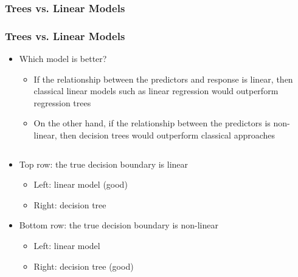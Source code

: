 \documentclass[
  shownotes,
  xcolor={svgnames},
  hyperref={colorlinks,citecolor=DarkBlue,linkcolor=DarkRed,urlcolor=DarkBlue}
  , aspectratio=169]{beamer}
\begin{document}
\subsubsection{Trees vs. Linear Models}
\begin{frame}[fragile]
\frametitle{Trees vs. Linear Models}
\begin{itemize}
\item Which model is better?

\begin{itemize}
  \item If the relationship between the predictors and response is linear, then classical linear models such as linear regression would outperform regression trees
  \item On the other hand, if the relationship between the predictors is non-linear, then decision trees would outperform classical approaches
\end{itemize}
\end{itemize}


\begin{columns}[T] %
\begin{column}{.42\textwidth}
\scriptsize
\begin{itemize}  
\item Top row: the true decision boundary is linear
  \begin{itemize}
    \scriptsize
    \item Left: linear model (good)
    \item Right: decision tree 
  \end{itemize}

\item Bottom row: the true decision boundary is non-linear
  \begin{itemize}
    \scriptsize
    \item Left: linear model 
    \item Right: decision tree (good)
  \end{itemize}

\end{itemize}


\end{column}  
\hfill
\begin{column}{.48\textwidth}


\end{column}
\end{columns}
\end{frame}
\end{document}
